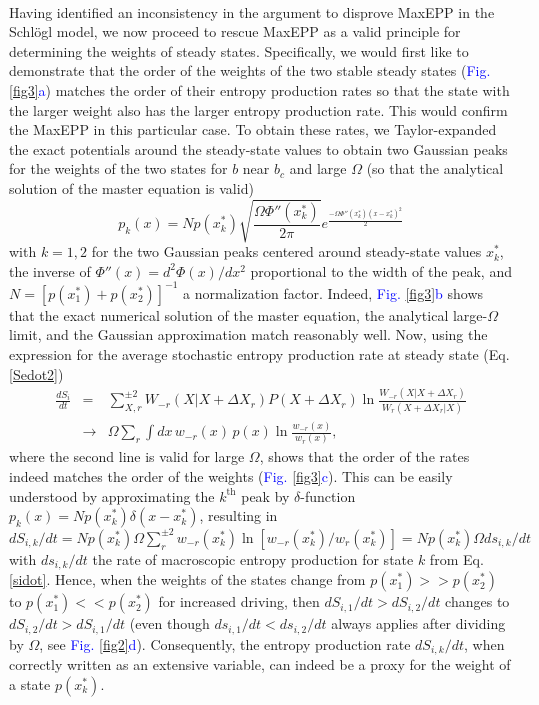 \documentclass[aps,prl,reprint,singlecolumn,superscriptaddress]{revtex4}
\begin{document}
{\\
Having identified an inconsistency in the argument to disprove MaxEPP in the Schl\"ogl model, we now proceed to rescue MaxEPP as a valid
principle for determining the weights of steady states.
Specifically, we would first like to demonstrate that the order of the weights of the two stable steady states (\textcolor{blue}{Fig. \ref{fig3}a})
matches the order of their entropy production rates so that the state with the larger weight also has the larger entropy production rate. 
This would confirm the MaxEPP in this particular case. To obtain these rates, {we Taylor-expanded the exact potentials around the
steady-state values to obtain two Gaussian peaks for the weights of the two states} for $b$ near $b_c$ and large $\Omega$ 
(so that the analytical solution of the master equation is valid)
\begin{equation}
p_{k}(x)=Np(x_k^*)\sqrt{\frac{\Omega\Phi''(x_k^*)}{2\pi}}e^{\frac{-\Omega\Phi''(x_k^*)(x-x_k^*)^2}{2}}\label{gauss}
\end{equation}
with $k=1,2$ for the two Gaussian peaks centered around steady-state values $x_k^*$, the inverse of $\Phi''(x)=d^2\Phi(x)/dx^2$
proportional to the width of the peak, and $N=[p(x_1^*)+p(x_2^*)]^{-1}$ a normalization factor. 
Indeed, \textcolor{blue}{Fig. \ref{fig3}b} shows that the exact numerical solution of the master equation, the analytical large-$\Omega$ limit, 
and the {Gaussian approximation match reasonably well}. Now, using the expression for the average stochastic entropy production rate at 
steady state (Eq. \ref{Sedot2}) \cite{schnakenberg76,lebowitz99,gaspard04}
\begin{eqnarray}
\frac{dS_i}{dt}\!\!\!&=&\sum_{X,r}^{\pm2} W_{-r}(X|X\!+\!\Delta X_r)P(X\!+\!\Delta X_r)
\ln\frac{W_{-r}(X|X\!+\!\Delta X_r)}{W_{r}(X\!+\!\Delta X_r|X)}\nonumber\\
&\rightarrow&\Omega\sum_{r}\int dx\,w_{-r}(x)\,p(x)\ln\frac{w_{-r}(x)}{w_{r}(x)},
\end{eqnarray}
where the second line is valid for large $\Omega$, 
shows that the order of the rates indeed matches the order of the weights (\textcolor{blue}{Fig. \ref{fig3}c}). This can
be easily understood by approximating the $k^\text{th}$ peak by $\delta$-function $p_k(x)=Np(x_k^*)\delta(x-x_k^*)$,
resulting in $dS_{i,k}/dt=Np(x_k^*)\Omega\sum_r^{\pm 2}w_{-r}(x_k^*)\ln[w_{-r}(x_k^*)/w_{r}(x_k^*)]=Np(x_k^*)\Omega ds_{i,k}/dt$ with
$ds_{i,k}/dt$ the rate of macroscopic entropy production for state $k$ from Eq. \ref{sidot}. Hence, when
the weights of the states change from $p(x_1^*)>\!\!>p(x_2^*)$ to $p(x_1^*)<\!\!<p(x_2^*)$ for increased
driving, then $dS_{i,1}/dt>dS_{i,2}/dt$ changes to $dS_{i,2}/dt>dS_{i,1}/dt$  (even though $ds_{i,1}/dt < ds_{i,2}/dt$ 
always applies after dividing by $\Omega$, see \textcolor{blue}{Fig. \ref{fig2}d}). Consequently, the entropy production rate 
$dS_{i,k}/dt$, when correctly written as an extensive variable, can indeed be a proxy for the weight of a state $p(x_k^*)$.

}
\end{document}

